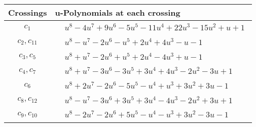 \documentclass[1p]{elsarticle_modified}
\theoremstyle{definition}
\begin{document}
\begin{tabular}{m{50pt}|m{274pt}}
Crossings & \hspace{64pt}u-Polynomials at each crossing \\
\hline $$\begin{aligned}c_{1}\end{aligned}$$&$\begin{aligned}
&u^8-4 u^7+9 u^6-5 u^5-11 u^4+22 u^3-15 u^2+u+1
\end{aligned}$\\
\hline $$\begin{aligned}c_{2},c_{11}\end{aligned}$$&$\begin{aligned}
&u^8- u^7-2 u^6- u^5+2 u^4+4 u^3- u-1
\end{aligned}$\\
\hline $$\begin{aligned}c_{3},c_{5}\end{aligned}$$&$\begin{aligned}
&u^8+u^7-2 u^6+u^5+2 u^4-4 u^3+u-1
\end{aligned}$\\
\hline $$\begin{aligned}c_{4},c_{7}\end{aligned}$$&$\begin{aligned}
&u^8+u^7-3 u^6-3 u^5+3 u^4+4 u^3-2 u^2-3 u+1
\end{aligned}$\\
\hline $$\begin{aligned}c_{6}\end{aligned}$$&$\begin{aligned}
&u^8+2 u^7-2 u^6-5 u^5- u^4+u^3+3 u^2+3 u-1
\end{aligned}$\\
\hline $$\begin{aligned}c_{8},c_{12}\end{aligned}$$&$\begin{aligned}
&u^8- u^7-3 u^6+3 u^5+3 u^4-4 u^3-2 u^2+3 u+1
\end{aligned}$\\
\hline $$\begin{aligned}c_{9},c_{10}\end{aligned}$$&$\begin{aligned}
&u^8-2 u^7-2 u^6+5 u^5- u^4- u^3+3 u^2-3 u-1
\end{aligned}$\\
\hline
\end{tabular}\\~\\
\end{document}
